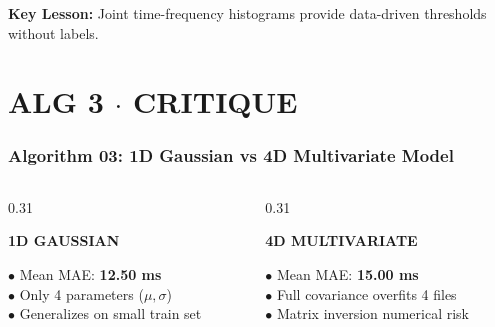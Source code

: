 \documentclass[aspectratio=169, 10pt]{beamer}
\begin{document}
\begin{frame}
\begin{tcolorbox}[contentframe]
  \vspace{10pt}
  \begin{center}
    {\fontsize{8.5pt}{10pt}\selectfont\color{textMuted}\textbf{Key Lesson:} Joint time-frequency histograms provide data-driven thresholds without labels.}
  \end{center}
  \end{tcolorbox}
\end{frame}

\section{ALG 3 $\cdot$ CRITIQUE}
\begin{frame}
  \frametitle{Algorithm 03: 1D Gaussian vs 4D Multivariate Model}
  \begin{tcolorbox}[contentframe]
  \begin{columns}[T]
    \begin{column}{0.31\textwidth}
      \begin{tcolorbox}[mintcard, height=3.85cm, valign=top]
        \centering
        {\fontsize{9.5pt}{11pt}\selectfont\color{mintGreen}\textbf{1D GAUSSIAN}}\\[4pt]
        \raggedright{\fontsize{8.5pt}{10pt}\selectfont
        $\bullet$ Mean MAE: \textbf{12.50 ms}\\[3pt]
        $\bullet$ Only 4 parameters ($\mu, \sigma$)\\[3pt]
        $\bullet$ Generalizes on small train set}
      \end{tcolorbox}
    \end{column}

    \begin{column}{0.31\textwidth}
      \begin{tcolorbox}[warncard, height=3.85cm, valign=top]
        \centering
        {\fontsize{9.5pt}{11pt}\selectfont\color{amberWarn}\textbf{4D MULTIVARIATE}}\\[4pt]
        \raggedright{\fontsize{8.5pt}{10pt}\selectfont
        $\bullet$ Mean MAE: \textbf{15.00 ms}\\[3pt]
        $\bullet$ Full covariance overfits 4 files\\[3pt]
        $\bullet$ Matrix inversion numerical risk}
      \end{tcolorbox}
    \end{column}


\end{columns}
\end{tcolorbox}
\end{frame}
\end{document}
